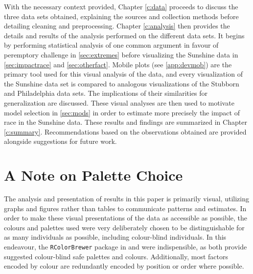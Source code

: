 With the necessary context provided, Chapter \ref{c:data} proceeds to discuss the three data sets obtained, explaining the sources
and collection methods before detailing cleaning and preprocessing. Chapter \ref{c:analysis} then provides the details and results
of the analysis performed on the different data sets. It begins by performing statistical analysis of one common argument in
favour of peremptory challenge in \ref{sec:extremes} before visualizing the Sunshine data in \ref{sec:impactrace} and
\ref{sec:otherfact}. Mobile plots (see \ref{app:devmob}) are the primary tool used for this visual analysis of the data, and
every visualization of the Sunshine data set is compared to analogous visualizations of the Stubborn and Philadelphia data
sets. The implications of their similarities for generalization are discussed. These visual analyses are then used to motivate
model selection in \ref{sec:mods} in order to estimate more precisely the impact of race in the Sunshine data. These results and
findings are summarized in Chapter \ref{c:summary}. Recommendations based on the observations obtained are provided alongside suggestions for future work.

\section{A Note on Palette Choice}

The analysis and presentation of results in this paper is primarily visual, utilizing graphs and figures rather than tables to
communicate patterns and estimates. In order to make these visual presentations of the data as accessible as possible, the colours
and palettes used were very deliberately chosen to be distinguishable for as many individuals as possible, including colour-blind
individuals. In this endeavour, the \texttt{RColorBrewer} package in  and \cite{wong2011} were
indispensible, as both provide suggested colour-blind safe palettes and colours. Additionally, most factors encoded by colour
are redundantly encoded by position or order where possible.

